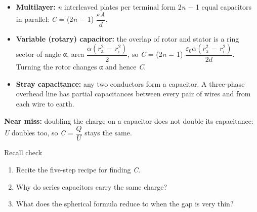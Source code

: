 \documentclass[11pt]{article}
\begin{document}
\begin{keepsection}
\begin{keepsection}
\begin{itemize}
\item \textbf{Multilayer:} \textit{n} interleaved plates per terminal form 2\textit{n} \ensuremath{-} 1 equal capacitors in parallel: \textit{C} = (2\textit{n} \ensuremath{-} 1) {\small\ensuremath{\dfrac{ε{A}}{{d}}}}.
\item \textbf{Variable (rotary) capacitor:} the overlap of rotor and stator is a ring sector of angle α, area {\small\ensuremath{\dfrac{α({r}_{\mathrm{a}}^{2}\, -\, {r}_{\mathrm{i}}^{2})}{2}}}, so \textit{C} = (2\textit{n} \ensuremath{-} 1) {\small\ensuremath{\dfrac{ε_{0}α({r}_{\mathrm{a}}^{2}\, -\, {r}_{\mathrm{i}}^{2})}{2{d}}}}. Turning the rotor changes α and hence \textit{C}.
\item \textbf{Stray capacitance:} any two conductors form a capacitor. A three-phase overhead line has partial capacitances between every pair of wires and from each wire to earth.
\end{itemize}

\begin{notebox}\textbf{Near miss:} doubling the charge on a capacitor does not double its capacitance: \textit{U} doubles too, so \textit{C} = {\small\ensuremath{\dfrac{{Q}}{{U}}}} stays the same.\end{notebox}

\begin{recallbox}{Recall check}
\begin{enumerate}
\item Recite the five-step recipe for finding \textit{C}.
\item Why do series capacitors carry the same charge?
\item What does the spherical formula reduce to when the gap is very thin?
\end{enumerate}

\end{recallbox}
\end{keepsection}
\end{keepsection}
\end{document}

